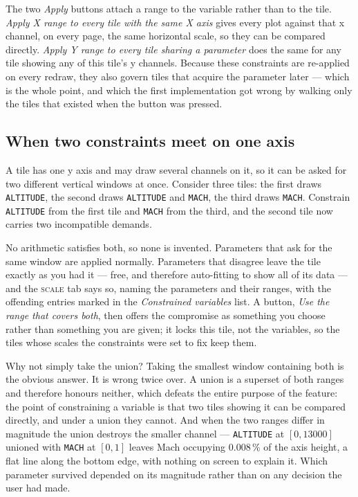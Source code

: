 \documentclass[11pt,a4paper,oneside]{report}
\newcommand{\code}[1]{\texttt{#1}}
\newcommand{\tab}[1]{\textsc{#1}}
\begin{document}
The two \emph{Apply} buttons attach a range to the variable rather than to the
tile. \emph{Apply X range to every tile with the same X axis} gives every plot
against that x channel, on every page, the same horizontal scale, so they can be
compared directly. \emph{Apply Y range to every tile sharing a parameter} does
the same for any tile showing any of this tile's y channels. Because these
constraints are re-applied on every redraw, they also govern tiles that acquire
the parameter later --- which is the whole point, and which the first
implementation got wrong by walking only the tiles that existed when the button
was pressed.

\subsection{When two constraints meet on one axis}

A tile has one y axis and may draw several channels on it, so it can be asked for
two different vertical windows at once. Consider three tiles: the first draws
\code{ALTITUDE}, the second draws \code{ALTITUDE} and \code{MACH}, the third
draws \code{MACH}. Constrain \code{ALTITUDE} from the first tile and \code{MACH}
from the third, and the second tile now carries two incompatible demands.

No arithmetic satisfies both, so none is invented. Parameters that ask for the
same window are applied normally. Parameters that disagree leave the tile exactly
as you had it --- free, and therefore auto-fitting to show all of its data ---
and the \tab{scale} tab says so, naming the parameters and their ranges, with the
offending entries marked in the \emph{Constrained variables} list. A button,
\emph{Use the range that covers both}, then offers the compromise as something
you choose rather than something you are given; it locks this tile, not the
variables, so the tiles whose scales the constraints were set to fix keep them.

\begin{aoenote}{Why not simply take the union?}
Taking the smallest window containing both is the obvious answer. It is wrong
twice over. A union is a superset of both
ranges and therefore honours neither, which defeats the entire purpose of the
feature: the point of constraining a variable is that two tiles showing it can be
compared directly, and under a union they cannot. And when the two ranges differ
in magnitude the union destroys the smaller channel --- \code{ALTITUDE} at
$[0, 13000]$ unioned with \code{MACH} at $[0, 1]$ leaves Mach occupying
0.008\,\% of the axis height, a flat line along the bottom edge, with nothing on
screen to explain it. Which parameter survived depended on its magnitude rather
than on any decision the user had made.
\end{aoenote}
\end{document}
